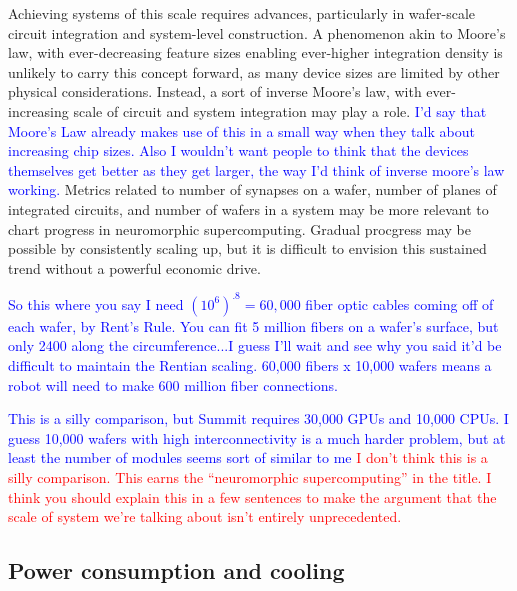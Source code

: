 \documentclass[twocolumn]{article}
\begin{document}
Achieving systems of this scale requires advances, particularly in wafer-scale circuit integration and system-level construction. A phenomenon akin to Moore's law, with ever-decreasing feature sizes enabling ever-higher integration density is unlikely to carry this concept forward, as many device sizes are limited by other physical considerations. Instead, a sort of inverse Moore's law, with ever-increasing scale of circuit and system integration may play a role. \textcolor{blue}{I'd say that Moore's Law already makes use of this in a small way when they talk about increasing chip sizes. Also I wouldn't want people to think that the devices themselves get better as they get larger, the way I'd think of inverse moore's law working.} Metrics related to number of synapses on a wafer, number of planes of integrated circuits, and number of wafers in a system may be more relevant to chart progress in neuromorphic supercomputing. Gradual procgress may be possible by consistently scaling up, but it is difficult to envision this sustained trend without a powerful economic drive.  

\textcolor{blue}{So this where you say I need $(10^6)^{.8} = 60,000$ fiber optic cables coming off of each wafer, by Rent's Rule. You can fit 5 million fibers on a wafer's surface, but only 2400 along the circumference...I guess I'll wait and see why you said it'd be difficult to maintain the Rentian scaling. 60,000 fibers x 10,000 wafers means a robot will need to make 600 million fiber connections.}


\textcolor{blue}{This is a silly comparison, but Summit requires 30,000 GPUs and 10,000 CPUs. I guess 10,000 wafers with high interconnectivity is a much harder problem, but at least the number of modules seems sort of similar to me}
\textcolor{red}{I don't think this is a silly comparison. This earns the ``neuromorphic supercomputing'' in the title. I think you should explain this in a few sentences to make the argument that the scale of system we're talking about isn't entirely unprecedented.}

\subsection{Power consumption and cooling}
\end{document}
